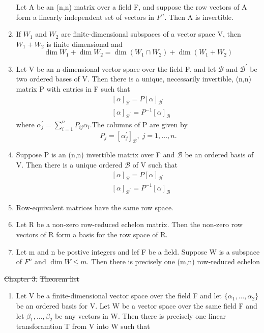 \documentclass[12pt, a4paper]{article}
\begin{document}
\begin{CJK*}{UTF8}{bsmi}
\begin{enumerate}
     Let A be an (n,n) matrix over a field F, and suppose the row vectors of A form a linearly independent set of vectors in \(F^n\). Then A is invertible.
    \item If \(W_1\) and \(W_2\) are finite-dimensional subspaces of a vector space V, then \(W_1+W_2\) is finite dimensional and \begin{equation}
        \dim W_1 + \dim W_2 = \dim{(W_1 \cap W_2)} + \dim(W_1+W_2) 
    \end{equation}
    \item Let V be an n-dimensional vector space over the field F, and let \(\mathscr{B}\) and \(\mathscr{B}^\prime\) be two ordered bases of V. Then there is a unique, necessarily invertible, (n,n) matrix P with entries in F such that\begin{align}
        &[\alpha]_\mathscr{B} = P [\alpha]_{\mathscr{B^\prime}}\\
        &[\alpha]_\mathscr{B^\prime} = P^{-1} [\alpha]_{\mathscr{B}}
    \end{align}
    where \(\alpha_j^\prime =\sum\limits_{i=1}^n P_{ij} \alpha_i\).The columns of P are given by\begin{equation}
        P_j = [\alpha_j^\prime]_{\mathscr{B}}, \; j=1,\ldots,n.
    \end{equation}
    \item Suppose P is an (n,n) invertible matrix over F and \(\mathscr{B}\) be an ordered basis of V. Then there is a unique ordered \(\mathscr{B}\) of V such that \begin{align}
        &[\alpha]_{\mathscr{B}} = P[\alpha]_{\mathscr{B^\prime}}\\
        &[\alpha]_{\mathscr{B^{\prime}}} = P^{-1}[\alpha]_{\mathscr{B}}
    \end{align}
    \item Row-equivalent matrices have the same row space.
    \item Let R be a non-zero row-reduced echelon matrix. Then the non-zero row vectors of R form a basis for the row space of R. 
    \item Let m and n be postive integers and lef F be a field. Suppose W is a subspace of \(F^n\) and \(\dim W\leq m\). Then there is precisely one (m,n) row-reduced echelon 
\end{enumerate}
\st{Chapter 3.}
\st{Theorem list}
\begin{enumerate}
    \item Let V be a finite-dimensional vector space over the field F and let \(\{\alpha_1,\ldots,\alpha_2\}\) be an ordered basis for V. Let W be a vector space over the same field F and let \(\beta_1,\ldots,\beta_2\) be any vectors in W. Then there is precisely one linear transforamtion T from V into W such that \begin{equation}

\end{equation}
\end{enumerate}
\end{CJK*}
\end{document}
